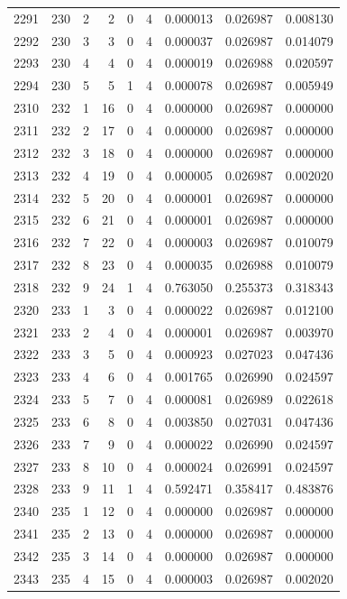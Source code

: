 \begin{longtable}{rrrrrrrrr}
2291 & 230 & 2 & 2 & 0 & 4 & 0.000013 & 0.026987 & 0.008130 \\
2292 & 230 & 3 & 3 & 0 & 4 & 0.000037 & 0.026987 & 0.014079 \\
2293 & 230 & 4 & 4 & 0 & 4 & 0.000019 & 0.026988 & 0.020597 \\
2294 & 230 & 5 & 5 & 1 & 4 & 0.000078 & 0.026987 & 0.005949 \\
2310 & 232 & 1 & 16 & 0 & 4 & 0.000000 & 0.026987 & 0.000000 \\
2311 & 232 & 2 & 17 & 0 & 4 & 0.000000 & 0.026987 & 0.000000 \\
2312 & 232 & 3 & 18 & 0 & 4 & 0.000000 & 0.026987 & 0.000000 \\
2313 & 232 & 4 & 19 & 0 & 4 & 0.000005 & 0.026987 & 0.002020 \\
2314 & 232 & 5 & 20 & 0 & 4 & 0.000001 & 0.026987 & 0.000000 \\
2315 & 232 & 6 & 21 & 0 & 4 & 0.000001 & 0.026987 & 0.000000 \\
2316 & 232 & 7 & 22 & 0 & 4 & 0.000003 & 0.026987 & 0.010079 \\
2317 & 232 & 8 & 23 & 0 & 4 & 0.000035 & 0.026988 & 0.010079 \\
2318 & 232 & 9 & 24 & 1 & 4 & 0.763050 & 0.255373 & 0.318343 \\
2320 & 233 & 1 & 3 & 0 & 4 & 0.000022 & 0.026987 & 0.012100 \\
2321 & 233 & 2 & 4 & 0 & 4 & 0.000001 & 0.026987 & 0.003970 \\
2322 & 233 & 3 & 5 & 0 & 4 & 0.000923 & 0.027023 & 0.047436 \\
2323 & 233 & 4 & 6 & 0 & 4 & 0.001765 & 0.026990 & 0.024597 \\
2324 & 233 & 5 & 7 & 0 & 4 & 0.000081 & 0.026989 & 0.022618 \\
2325 & 233 & 6 & 8 & 0 & 4 & 0.003850 & 0.027031 & 0.047436 \\
2326 & 233 & 7 & 9 & 0 & 4 & 0.000022 & 0.026990 & 0.024597 \\
2327 & 233 & 8 & 10 & 0 & 4 & 0.000024 & 0.026991 & 0.024597 \\
2328 & 233 & 9 & 11 & 1 & 4 & 0.592471 & 0.358417 & 0.483876 \\
2340 & 235 & 1 & 12 & 0 & 4 & 0.000000 & 0.026987 & 0.000000 \\
2341 & 235 & 2 & 13 & 0 & 4 & 0.000000 & 0.026987 & 0.000000 \\
2342 & 235 & 3 & 14 & 0 & 4 & 0.000000 & 0.026987 & 0.000000 \\
2343 & 235 & 4 & 15 & 0 & 4 & 0.000003 & 0.026987 & 0.002020 \\

\end{longtable}
